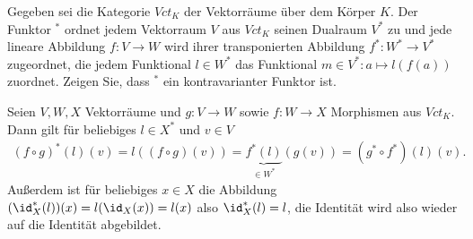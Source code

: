 \begin{exercise}
    Gegeben sei die Kategorie $Vct_K$ der Vektorräume über dem Körper $K$. Der Funktor $^*$ ordnet jedem Vektorraum $V$ aus $Vct_K$ seinen Dualraum $V^*$ zu und jede lineare Abbildung $f:V \to W$ wird ihrer transponierten Abbildung $f^*: W^* \to V^*$ zugeordnet, die jedem Funktional $l \in W^*$ das Funktional $m \in V^* : a \mapsto l(f(a))$ zuordnet. Zeigen Sie, dass $^*$ ein kontravarianter Funktor ist.
\end{exercise}
\begin{solution}
    Seien $V, W, X$ Vektorräume und $g:V \to W$ sowie $f:W \to X$ Morphismen aus $Vct_K$. Dann gilt für beliebiges $l \in X^*$ und $v \in V$
    \begin{align*}
        (f \circ g)^*(l)(v) = l((f \circ g)(v)) = \underbrace{f^*(l)}_{\in W^*}(g(v)) = (g^* \circ f^*)(l)(v).
    \end{align*} 
    Außerdem ist für beliebiges $x \in X$ die Abbildung $(\id_X^*(l))(x) = l(\id_X(x)) = l(x)$ also $\id_X^*(l) = l$, die Identität wird also wieder auf die Identität abgebildet. 
\end{solution}